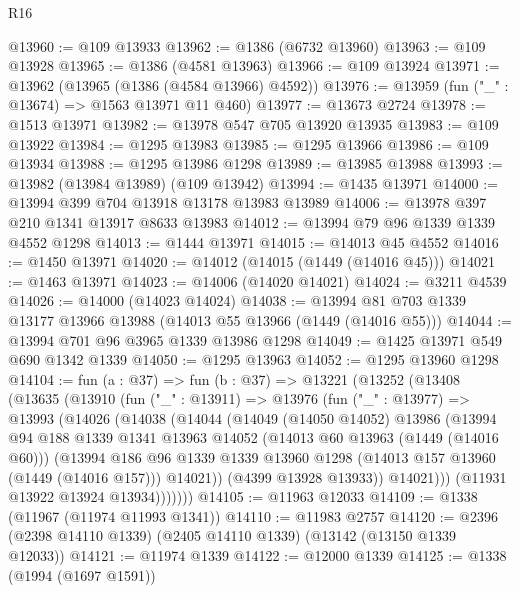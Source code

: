 \begin{lexlean}{R16}
\begin{coremodule}
@13960 := @109 @13933
@13962 := @1386 (@6732 @13960)
@13963 := @109 @13928
@13965 := @1386 (@4581 @13963)
@13966 := @109 @13924
@13971 := @13962 (@13965 (@1386 (@4584 @13966) @4592))
@13976 := @13959 (fun ("_" : @13674) => @1563 @13971 @11 @460)
@13977 := @13673 @2724
@13978 := @1513 @13971
@13982 := @13978 @547 @705 @13920 @13935
@13983 := @109 @13922
@13984 := @1295 @13983
@13985 := @1295 @13966
@13986 := @109 @13934
@13988 := @1295 @13986 @1298
@13989 := @13985 @13988
@13993 := @13982 (@13984 @13989) (@109 @13942)
@13994 := @1435 @13971
@14000 := @13994 @399 @704 @13918 @13178 @13983 @13989
@14006 := @13978 @397 @210 @1341 @13917 @8633 @13983
@14012 := @13994 @79 @96 @1339 @1339 @4552 @1298
@14013 := @1444 @13971
@14015 := @14013 @45 @4552
@14016 := @1450 @13971
@14020 := @14012 (@14015 (@1449 (@14016 @45)))
@14021 := @1463 @13971
@14023 := @14006 (@14020 @14021)
@14024 := @3211 @4539
@14026 := @14000 (@14023 @14024)
@14038 := @13994 @81 @703 @1339 @13177 @13966 @13988 (@14013 @55 @13966 (@1449 (@14016 @55)))
@14044 := @13994 @701 @96 @3965 @1339 @13986 @1298
@14049 := @1425 @13971 @549 @690 @1342 @1339
@14050 := @1295 @13963
@14052 := @1295 @13960 @1298
@14104 := fun (a : @37) =>
  fun (b : @37) =>
  @13221
    (@13252
      (@13408
        (@13635
          (@13910
            (fun ("_" : @13911) =>
            @13976
              (fun ("_" : @13977) =>
              @13993
                (@14026
                  (@14038
                    (@14044
                      (@14049
                        (@14050 @14052)
                        @13986
                        (@13994
                          @94
                          @188
                          @1339
                          @1341
                          @13963
                          @14052
                          (@14013 @60 @13963 (@1449 (@14016 @60)))
                          (@13994
                            @186
                            @96
                            @1339
                            @1339
                            @13960
                            @1298
                            (@14013 @157 @13960 (@1449 (@14016 @157)))
                            @14021))
                        (@4399 @13928 @13933))
                      @14021)))
                (@11931 @13922 @13924 @13934)))))))
@14105 := @11963 @12033
@14109 := @1338 (@11967 (@11974 @11993 @1341))
@14110 := @11983 @2757
@14120 := @2396 (@2398 @14110 @1339) (@2405 @14110 @1339) (@13142 (@13150 @1339 @12033))
@14121 := @11974 @1339
@14122 := @12000 @1339
@14125 := @1338 (@1994 (@1697 @1591))

\end{coremodule}
\end{lexlean}
